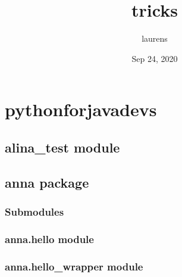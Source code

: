 \documentclass[letterpaper,10pt,english]{sphinxmanual}
\title{tricks}
\date{Sep 24, 2020}
\author{laurens}
\begin{document}
\pagestyle{empty}
\sphinxmaketitle
\pagestyle{plain}
\sphinxtableofcontents
\pagestyle{normal}
\label{\detokenize{index::doc}}



\chapter{python\sphinxhyphen{}for\sphinxhyphen{}java\sphinxhyphen{}devs}
\label{\detokenize{modules:python-for-java-devs}}\label{\detokenize{modules::doc}}

\section{alina\_test module}
\label{\detokenize{alina_test:alina-test-module}}\label{\detokenize{alina_test::doc}}

\section{anna package}
\label{\detokenize{anna:anna-package}}\label{\detokenize{anna::doc}}

\subsection{Submodules}
\label{\detokenize{anna:submodules}}

\subsection{anna.hello module}
\label{\detokenize{anna:module-anna.hello}}\label{\detokenize{anna:anna-hello-module}}

\begin{fulllineitems}
\label{\detokenize{anna:anna.hello.say_hello}}
\end{fulllineitems}



\subsection{anna.hello\_wrapper module}
\label{\detokenize{anna:anna-hello-wrapper-module}}
\end{document}
